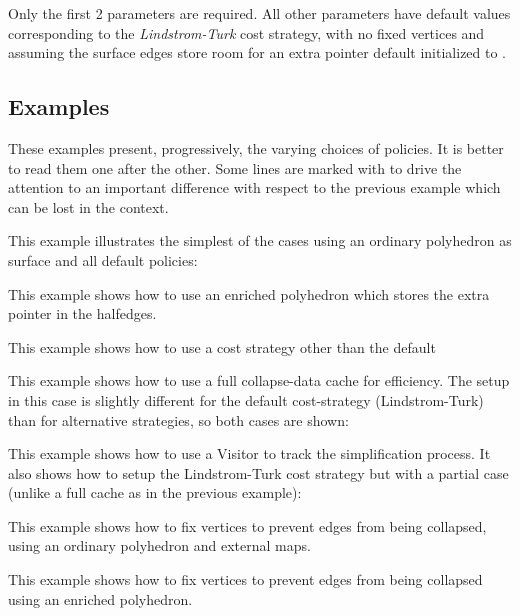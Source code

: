 Only the first 2 parameters are required. All other parameters have default values corresponding to the {\em Lindstrom-Turk} cost strategy, with no fixed vertices and assuming the surface edges store room for an extra pointer default initialized to .

\subsection{Examples}

These examples present, progressively, the varying choices of policies. It is better to read them one after the other.
Some lines are marked with  to drive the attention to an important difference with respect to the previous example which can be lost in the context.

This example illustrates the simplest of the cases using an ordinary polyhedron as surface and all default policies:

This example shows how to use an enriched polyhedron which stores the extra pointer in the halfedges.

This example shows how to use a cost strategy other than the default

This example shows how to use a full collapse-data cache for efficiency. The setup in this case is slightly different for the default cost-strategy (Lindstrom-Turk) than for alternative strategies, so both cases are shown:

This example shows how to use a Visitor to track the simplification process. It also shows how to setup the Lindstrom-Turk cost strategy but with a partial case (unlike a full cache as in the previous example):

This example shows how to fix vertices to prevent edges from being collapsed, using an ordinary polyhedron and external maps.

This example shows how to fix vertices to prevent edges from being collapsed using an enriched polyhedron.




